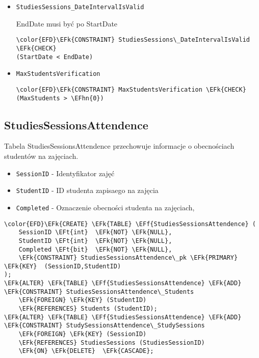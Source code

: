 \documentclass[11pt]{article}
\newcommand{\EFk}[1]{\textcolor{EFk}{\textbf{#1}}} %
\newcommand{\EFf}[1]{\textcolor{EFf}{#1}} %
\newcommand{\EFt}[1]{\textcolor{EFt}{\textbf{#1}}} %
\newcommand{\EFhn}[1]{\textcolor{EFhn}{#1}} %
\begin{document}
\begin{itemize}
\item \texttt{StudiesSessions\_DateIntervalIsValid}

EndDate musi być po StartDate
\begin{Code}
\begin{Verbatim}
\color{EFD}\EFk{CONSTRAINT} StudiesSessions\_DateIntervalIsValid \EFk{CHECK}
(StartDate < EndDate)
\end{Verbatim}
\end{Code}
\item \texttt{MaxStudentsVerification}
\begin{Code}
\begin{Verbatim}
\color{EFD}\EFk{CONSTRAINT} MaxStudentsVerification \EFk{CHECK}
(MaxStudents > \EFhn{0})
\end{Verbatim}
\end{Code}
\end{itemize}
\subsection{StudiesSessionsAttendence}
\label{sec:org958fb89}
Tabela StudiesSessionsAttendence przechowuje informacje o obecnościach studentów na zajęciach.
\begin{itemize}
\item \texttt{SessionID} - Identyfikator zajęć
\item \texttt{StudentID} - ID studenta zapisaego na zajęcia
\item \texttt{Completed} - Oznaczenie obecności studenta na zajęciach,
\end{itemize}
\begin{Code}
\begin{Verbatim}
\color{EFD}\EFk{CREATE} \EFk{TABLE} \EFf{StudiesSessionsAttendence} (
    SessionID \EFt{int}  \EFk{NOT} \EFk{NULL},
    StudentID \EFt{int}  \EFk{NOT} \EFk{NULL},
    Completed \EFt{bit}  \EFk{NOT} \EFk{NULL},
    \EFk{CONSTRAINT} StudiesSessionsAttendence\_pk \EFk{PRIMARY} \EFk{KEY}  (SessionID,StudentID)
);
\EFk{ALTER} \EFk{TABLE} \EFf{StudiesSessionsAttendence} \EFk{ADD} \EFk{CONSTRAINT} StudiesSessionsAttendence\_Students
    \EFk{FOREIGN} \EFk{KEY} (StudentID)
    \EFk{REFERENCES} Students (StudentID);
\EFk{ALTER} \EFk{TABLE} \EFf{StudiesSessionsAttendence} \EFk{ADD} \EFk{CONSTRAINT} StudySessionsAttendence\_StudySessions
    \EFk{FOREIGN} \EFk{KEY} (SessionID)
    \EFk{REFERENCES} StudiesSessions (StudiesSessionID)
    \EFk{ON} \EFk{DELETE}  \EFk{CASCADE};
\end{Verbatim}
\end{Code}
\end{document}
